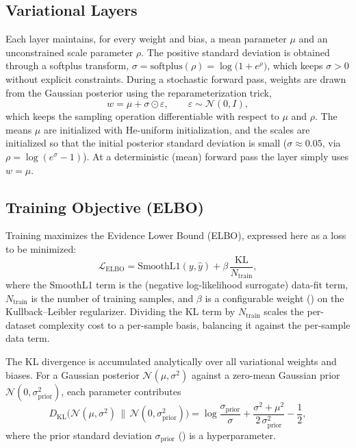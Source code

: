\subsection{Variational Layers}

Each  layer maintains, for every weight and bias, a mean
parameter $\mu$ and an unconstrained scale parameter $\rho$. The positive
standard deviation is obtained through a softplus transform,
$\sigma = \mathrm{softplus}(\rho) = \log\!\big(1 + e^{\rho}\big)$, which keeps
$\sigma > 0$ without explicit constraints. During a stochastic forward pass,
weights are drawn from the Gaussian posterior using the reparameterization
trick,
\begin{equation}
  w = \mu + \sigma \odot \varepsilon, \qquad \varepsilon \sim \mathcal{N}(0, I),
\end{equation}
which keeps the sampling operation differentiable with respect to $\mu$ and
$\rho$. The means $\mu$ are initialized with He-uniform initialization, and the
scales are initialized so that the initial posterior standard deviation is small
($\sigma \approx 0.05$, via $\rho = \log(e^{\sigma}-1)$). At a deterministic
(mean) forward pass the layer simply uses $w=\mu$.

\subsection{Training Objective (ELBO)}

Training maximizes the Evidence Lower Bound (ELBO), expressed here as a loss to
be minimized:
\begin{equation}
  \mathcal{L}_\text{ELBO} =
  \mathrm{SmoothL1}(y, \hat{y})
  + \beta\,\frac{\mathrm{KL}}{N_\text{train}},
  \label{eq:elbo}
\end{equation}
where the SmoothL1 term is the (negative log-likelihood surrogate) data-fit
term, $N_\text{train}$ is the number of training samples, and $\beta$ is a
configurable weight () on the Kullback--Leibler regularizer.
Dividing the KL term by $N_\text{train}$ scales the per-dataset complexity cost
to a per-sample basis, balancing it against the per-sample data term.

The KL divergence is accumulated analytically over all variational weights and
biases. For a Gaussian posterior $\mathcal{N}(\mu, \sigma^2)$ against a
zero-mean Gaussian prior $\mathcal{N}(0, \sigma_\text{prior}^2)$, each parameter
contributes
\begin{equation}
  D_\text{KL}\!\big(\mathcal{N}(\mu,\sigma^2)\,\|\,\mathcal{N}(0,\sigma_\text{prior}^2)\big)
  = \log\frac{\sigma_\text{prior}}{\sigma}
  + \frac{\sigma^2 + \mu^2}{2\,\sigma_\text{prior}^2}
  - \frac{1}{2},
\end{equation}
where the prior standard deviation $\sigma_\text{prior}$ () is
a hyperparameter.

